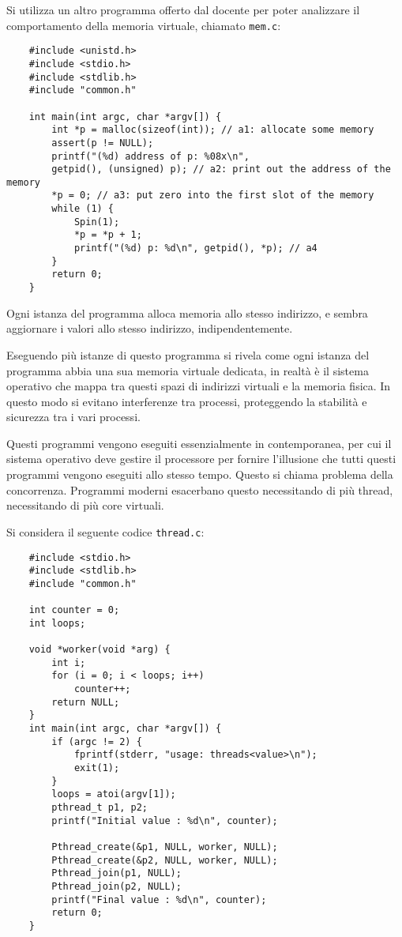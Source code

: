 \documentclass{article}
\numberwithin{equation}{subsection}
\begin{document}
Si utilizza un altro programma offerto dal docente per poter analizzare il comportamento della memoria virtuale, chiamato \verb|mem.c|:
\begin{verbatim}
	#include <unistd.h>
	#include <stdio.h>
	#include <stdlib.h>
	#include "common.h"

	int main(int argc, char *argv[]) {
		int *p = malloc(sizeof(int)); // a1: allocate some memory
		assert(p != NULL);
		printf("(%d) address of p: %08x\n",
		getpid(), (unsigned) p); // a2: print out the address of the memory
		*p = 0; // a3: put zero into the first slot of the memory
		while (1) {
			Spin(1);
			*p = *p + 1;
			printf("(%d) p: %d\n", getpid(), *p); // a4
		}
		return 0;
	}
\end{verbatim}
Ogni istanza del programma alloca memoria allo stesso indirizzo, e sembra aggiornare i valori allo stesso indirizzo, indipendentemente. 

Eseguendo più istanze di questo programma si rivela come ogni istanza del programma abbia una sua memoria virtuale dedicata, in realtà è il sistema operativo che mappa 
tra questi spazi di indirizzi virtuali e la memoria fisica. In questo modo si evitano interferenze tra processi, proteggendo la stabilità e sicurezza tra i vari processi. 


Questi programmi vengono eseguiti essenzialmente in contemporanea, per cui il sistema operativo deve gestire il processore per fornire l'illusione 
che tutti questi programmi vengono eseguiti allo stesso tempo. Questo si chiama problema della concorrenza. 
Programmi moderni esacerbano questo necessitando di più thread, necessitando di più core virtuali. 

Si considera il seguente codice \verb|thread.c|:
\begin{verbatim}
	#include <stdio.h>
	#include <stdlib.h>
	#include "common.h"

	int counter = 0;
	int loops;

	void *worker(void *arg) {
		int i;
		for (i = 0; i < loops; i++) 
			counter++;
		return NULL;
	}
	int main(int argc, char *argv[]) {
        if (argc != 2) {
            fprintf(stderr, "usage: threads<value>\n");
            exit(1);
        }
        loops = atoi(argv[1]);
        pthread_t p1, p2;
        printf("Initial value : %d\n", counter);

        Pthread_create(&p1, NULL, worker, NULL);
        Pthread_create(&p2, NULL, worker, NULL);
        Pthread_join(p1, NULL);
        Pthread_join(p2, NULL);
        printf("Final value : %d\n", counter);
        return 0;
	}
\end{verbatim}
\end{document}
